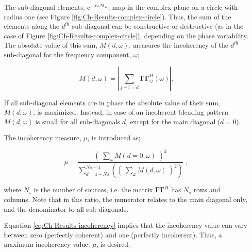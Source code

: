 The sub-diagonal elements, $\mathrm{e}^{-j \omega \Delta t_{kl}}$, map in the complex plane on a circle with radius one (see Figure \ref{fig:Ch-Results-complex-circle}). Thus, the sum of the elements along the $d^{th}$ sub-diagonal can be constructive or destructive (as in the case of Figure \ref{fig:Ch-Results-complex-circle}), depending on the phase variability. The absolute value of this sum, $M(d,\omega)$, measures the incoherency of the $d^{th}$ sub-diagonal for the frequency component, $\omega$;

\begin{equation}
	M(d,\omega) = \left| \sum_{j-i=d} \mathbf{\Gamma \Gamma}^H_{ij} (\omega) \right|.
	\label{eq:Ch-Results-incoherency-diagsum}	
\end{equation} 

If all sub-diagonal elements are in phase the absolute value of their sum, $M(d,\omega)$, is maximized. Instead, in case of an incoherent blending pattern $M(d,\omega)$ is small for all sub-diagonals $d$, except for the main diagonal ($d = 0$).  

The incoherency measure, $\mu$, is introduced as;

\begin{equation}
	\mu = \frac{\left( \; \sum_{\omega}M(d=0,\omega) \; \right)^2}{\sum_{d = 1-Ns}^{Ns-1} \left(\left( \; \sum_{\omega}M(d,\omega) \; \right)^2\right)} \; ,
	\label{eq:Ch-Results-incoherency}
\end{equation}

where $N_s$ is the number of sources, i.e. the matrix $\mathbf{\Gamma \Gamma}^H$ has $N_s$ rows and columns. Note that in this ratio, the numerator relates to the main diagonal only, and the denominator to all sub-diagonals.

Equation \ref{eq:Ch-Results-incoherency} implies that the incoherency value can vary between zero (perfectly coherent) and one (perfectly incoherent). Thus, a maximum incoherency value, $\mu$, is desired.


